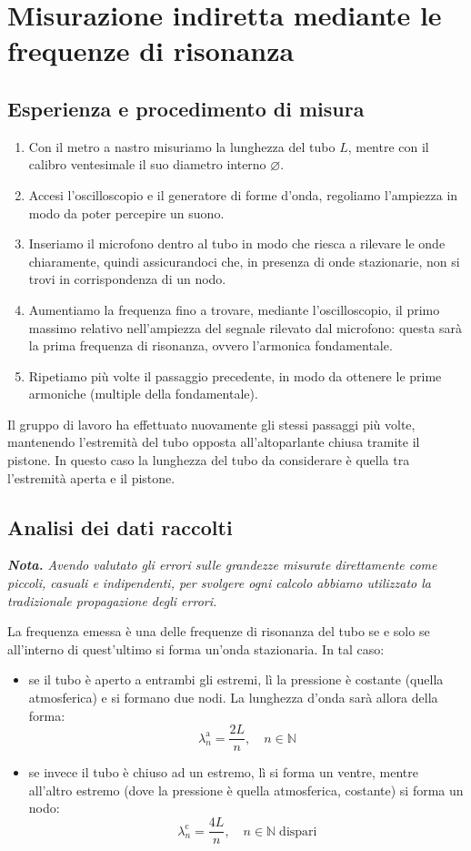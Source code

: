 \documentclass{article}
\newcommand*{\diam}{\varnothing}
\begin{document}
\pagebreak
\section{Misurazione indiretta mediante le frequenze di risonanza}

\subsection{Esperienza e procedimento di misura}

\begin{enumerate}
  \item
    Con il metro a nastro misuriamo la lunghezza del tubo $L$,
    mentre con il calibro ventesimale il suo diametro interno
    $\diam$.
  \item
    Accesi l'oscilloscopio e il generatore di forme d'onda,
    regoliamo l'ampiezza in modo da poter percepire un suono.
  \item
    Inseriamo il microfono dentro al tubo in modo che riesca a rilevare le onde
    chiaramente, quindi assicurandoci che, in presenza di onde stazionarie,
    non si trovi in corrispondenza di un nodo.
  \item
    Aumentiamo la frequenza fino a trovare, mediante l'oscilloscopio,
    il primo massimo relativo nell'ampiezza del segnale rilevato dal
    microfono: questa sarà la prima frequenza di risonanza,
    ovvero l'armonica fondamentale.
  \item
    Ripetiamo più volte il passaggio precedente, in modo da ottenere le prime
    armoniche (multiple della fondamentale).
\end{enumerate}
Il gruppo di lavoro ha effettuato nuovamente gli stessi passaggi più volte,
mantenendo l'estremità del tubo opposta all'altoparlante chiusa tramite il pistone.
In questo caso la lunghezza del tubo da considerare è quella tra l'estremità
aperta e il pistone.

\subsection{Analisi dei dati raccolti}
\emph{\textbf{Nota.}
Avendo valutato gli errori sulle grandezze misurate direttamente
come piccoli, casuali e indipendenti, per svolgere ogni calcolo
abbiamo utilizzato la tradizionale propagazione degli errori.
}
\vspace{2mm}

La frequenza emessa è una delle frequenze di risonanza del tubo se e solo se
all'interno di quest'ultimo si forma un'onda stazionaria. In tal caso:
\begin{itemize}
  \item se il tubo è aperto a entrambi gli estremi,
    lì la pressione è costante (quella atmosferica) e si formano due nodi.
    La lunghezza d'onda sarà allora della forma:
    \[ \lambda_n^\text{a} = \frac{2L}{n},\quad n\in\mathbb{N} \]
  \item se invece il tubo è chiuso ad un estremo,
    lì si forma un ventre, mentre all'altro estremo (dove la pressione è
    quella atmosferica, costante) si forma un nodo:
    \[ \lambda_n^\text{c} = \frac{4L}{n},\quad n\in\mathbb{N}\;\text{dispari} \]
\end{itemize}
\end{document}
